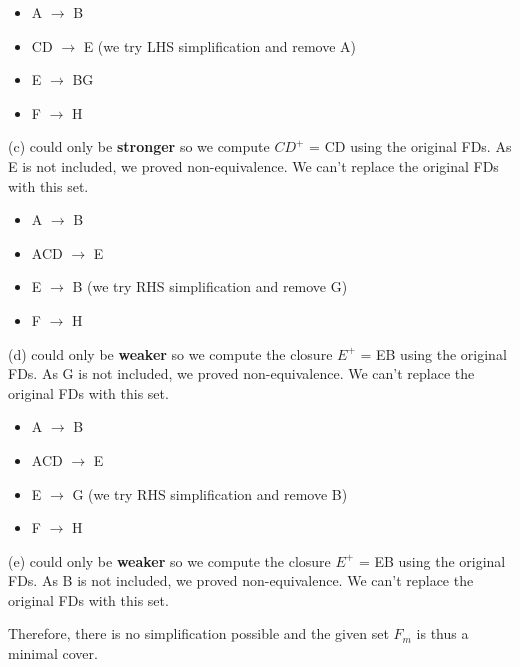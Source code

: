 \documentclass[9pt]{article}
\begin{document}
\begin{enumerate}
\begin{enumerate}
        \begin{itemize}
          \item A $\rightarrow$ B
          \item CD $\rightarrow$ E (we try LHS simplification and remove A)
          \item E $\rightarrow$ BG
          \item F $\rightarrow$ H
        \end{itemize}
        (c) could only be \textbf{stronger} so we compute $CD^+$ = CD using the original FDs. As E is not included, we proved non-equivalence. We can't replace the original FDs with this set.
        \begin{itemize}
          \item A $\rightarrow$ B
          \item ACD $\rightarrow$ E
          \item E $\rightarrow$ B (we try RHS simplification and remove G)
          \item F $\rightarrow$ H
        \end{itemize}
        (d) could only be \textbf{weaker} so we compute the closure $E^+$ = EB using the original FDs. As G is not included, we proved non-equivalence. We can't replace the original FDs with this set.
        \begin{itemize}
          \item A $\rightarrow$ B
          \item ACD $\rightarrow$ E
          \item E $\rightarrow$ G (we try RHS simplification and remove B)
          \item F $\rightarrow$ H
        \end{itemize}
        (e) could only be \textbf{weaker} so we compute the closure $E^+$ = EB using the original FDs. As B is not included, we proved non-equivalence. We can't replace the original FDs with this set.    
    \end{enumerate}
    Therefore, there is no simplification possible and the given set $F_m$ is thus a minimal cover.
    

\end{enumerate}
\end{document}
